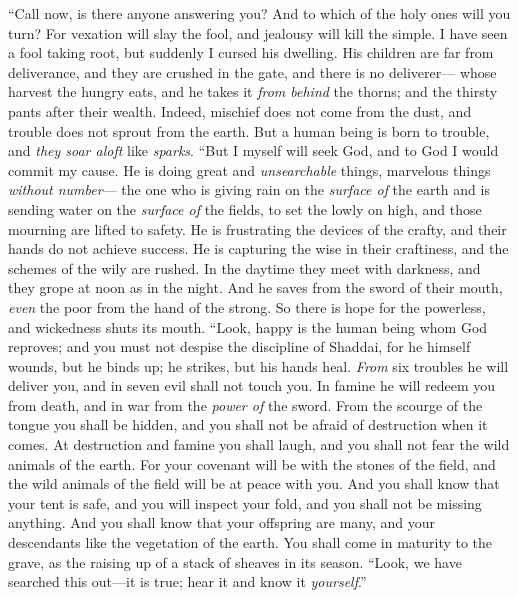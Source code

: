 \begin{biblechapter} %
 “Call now, is there anyone answering you? 
And to which of the holy ones will you turn?
\verse For vexation will slay the fool, 
and jealousy will kill the simple.
\verse I have seen a fool taking root, 
but suddenly I cursed his dwelling.
\verse His children are far from deliverance, 
and they are crushed in the gate, 
and there is no deliverer—
\verse whose harvest the hungry eats, 
and he takes it \textit{from behind} the thorns; 
and the thirsty pants after their wealth.
\verse Indeed, mischief does not come from the dust, 
and trouble does not sprout from the earth.
\verse But a human being is born to trouble, 
and \textit{they soar aloft} like \textit{sparks}.
\verse “But I myself will seek God, 
and to God I would commit my cause.
\verse He is doing great and \textit{unsearchable} things, 
marvelous things \textit{without number}—
\verse the one who is giving rain on the \textit{surface of} the earth 
and is sending water on the \textit{surface of} the fields,
\verse to set the lowly on high, 
and those mourning are lifted to safety.
\verse He is frustrating the devices of the crafty, 
and their hands do not achieve success.
\verse He is capturing the wise in their craftiness, 
and the schemes of the wily are rushed.
\verse In the daytime they meet with darkness, 
and they grope at noon as in the night.
\verse And he saves from the sword of their mouth, 
\textit{even} the poor from the hand of the strong.
\verse So there is hope for the powerless, 
and wickedness shuts its mouth.
\verse “Look, happy is the human being whom God reproves; 
and you must not despise the discipline of Shaddai,
\verse for he himself wounds, but he binds up; 
he strikes, but his hands heal.
\verse \textit{From} six troubles he will deliver you, 
and in seven evil shall not touch you.
\verse In famine he will redeem you from death, 
and in war from the \textit{power of} the sword.
\verse From the scourge of the tongue you shall be hidden, 
and you shall not be afraid of destruction when it comes.
\verse At destruction and famine you shall laugh, 
and you shall not fear the wild animals of the earth.
\verse For your covenant will be with the stones of the field, 
and the wild animals of the field will be at peace with you.
\verse And you shall know that your tent is safe, 
and you will inspect your fold, and you shall not be missing anything.
\verse And you shall know that your offspring are many, 
and your descendants like the vegetation of the earth.
\verse You shall come in maturity to the grave, 
as the raising up of a stack of sheaves in its season.
\verse “Look, we have searched this out—it is true; 
hear it and know it \textit{yourself}.”
\end{biblechapter}

